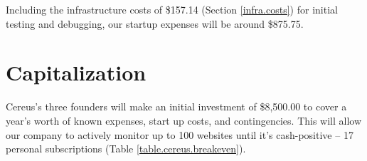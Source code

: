 \noindent
Including the infrastructure costs of \$157.14 (Section \ref{infra.costs}) for initial testing and debugging, our startup expenses will be around \$875.75.

\section{Capitalization}

Cereus's three founders will make an initial investment of \$8,500.00 to cover a year's worth of known expenses, start up costs, and contingencies. This will allow our company to actively monitor up to 100 websites until it's cash-positive -- 17 personal subscriptions (Table \ref{table.cereus.breakeven}).

